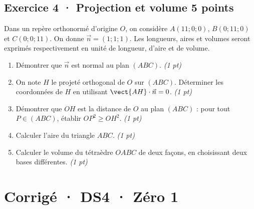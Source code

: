 \subsection*{Exercice 4 · Projection et volume \hfill 5 points}Dans un repère orthonormé d'origine $O$, on considère $A(11;0;0)$, $B(0;11;0)$ et $C(0;0;11)$. On donne $\vec n=(1;1;1)$. Les longueurs, aires et volumes seront exprimés respectivement en unité de longueur, d'aire et de volume.

\begin{enumerate}

\item Démontrer que $\vec n$ est normal au plan $(ABC)$. \hfill\textit{(1 pt)}

\item On note $H$ le projeté orthogonal de $O$ sur $(ABC)$. Déterminer les coordonnées de $H$ en utilisant $\vect{AH}\cdot\vec n=0$. \hfill\textit{(1 pt)}

\item Démontrer que $OH$ est la distance de $O$ au plan $(ABC)$ : pour tout $P\in(ABC)$, établir $OP^2\ge OH^2$. \hfill\textit{(1 pt)}

\item Calculer l'aire du triangle $ABC$. \hfill\textit{(1 pt)}

\item Calculer le volume du tétraèdre $OABC$ de deux façons, en choisissant deux bases différentes. \hfill\textit{(1 pt)}

\end{enumerate}

\ifprof\clearpage

\section*{Corrigé · DS4 · Zéro 1}\label{cor:6-1}

